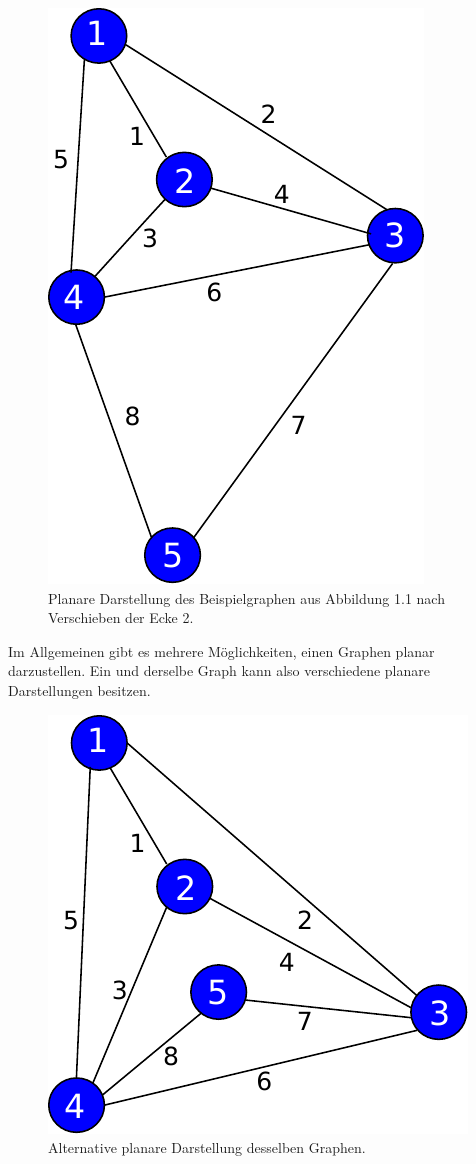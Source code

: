 \documentclass[11pt,a4paper,leqno]{report}
\numberwithin{equation}{chapter}
\begin{document}
\begin{figure}[H]
	\begin{center}
		\includegraphics[scale=0.4]{Abbildungen/graph_1_planar.pdf}
		\caption{Planare Darstellung des Beispielgraphen aus Abbildung 1.1 nach Verschieben der Ecke 2.}
	\end{center}
\end{figure}
\noindent
Im Allgemeinen gibt es mehrere Möglichkeiten, einen Graphen planar darzustellen. Ein und derselbe Graph kann also verschiedene planare Darstellungen besitzen.
\begin{figure}[H]
	\begin{center}
		\includegraphics[scale=0.4]{Abbildungen/graph_1_planar2.pdf}
		\caption{Alternative planare Darstellung desselben Graphen.}
	\end{center}
\end{figure}
\end{document}
